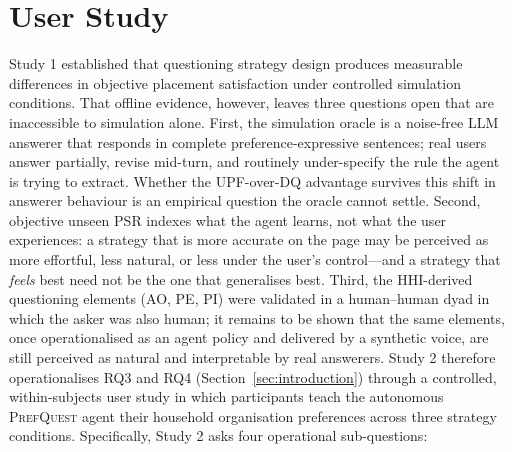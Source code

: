 \documentclass[manuscript,review,anonymous]{acmart}
\begin{document}
\section{User Study}
\label{sec:study2}

Study 1 established that questioning strategy design produces measurable differences in objective placement satisfaction under controlled simulation conditions. That offline evidence, however, leaves three questions open that are inaccessible to simulation alone. First, the simulation oracle is a noise-free LLM answerer that responds in complete preference-expressive sentences; real users answer partially, revise mid-turn, and routinely under-specify the rule the agent is trying to extract. Whether the UPF-over-DQ advantage survives this shift in answerer behaviour is an empirical question the oracle cannot settle. Second, objective unseen PSR indexes what the agent learns, not what the user experiences: a strategy that is more accurate on the page may be perceived as more effortful, less natural, or less under the user's control---and a strategy that \textit{feels} best need not be the one that generalises best. Third, the HHI-derived questioning elements (AO, PE, PI) were validated in a human--human dyad in which the asker was also human; it remains to be shown that the same elements, once operationalised as an agent policy and delivered by a synthetic voice, are still perceived as natural and interpretable by real answerers. Study 2 therefore operationalises RQ3 and RQ4 (Section~\ref{sec:introduction}) through a controlled, within-subjects user study in which participants teach the autonomous \textsc{PrefQuest} agent their household organisation preferences across three strategy conditions. Specifically, Study 2 asks four operational sub-questions:
\end{document}
